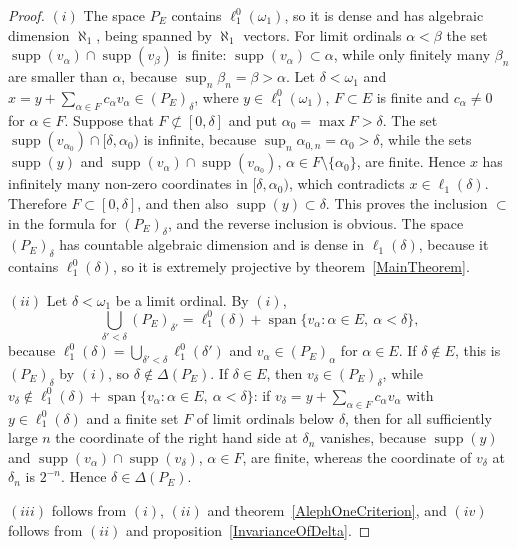 \documentclass[12pt]{article}
\newcommand{\lo}[1]{\ell_1^0(#1)}
\newcommand{\ellone}[1]{\ell_1(#1)}
\newcommand{\supp}{\operatorname{supp}}
\newcommand{\Lin}{\operatorname{span}}
\begin{document}
\begin{proof} $(i)$ The space $P_E$ contains $\lo{\omega_1}$, so it is dense
    and has algebraic dimension $\aleph_1$, being spanned by $\aleph_1$
    vectors. For limit ordinals $\alpha<\beta$
    the set $\supp(v_\alpha)\cap\supp(v_\beta)$ is finite:
    $\supp(v_\alpha)\subset\alpha$, while only finitely many $\beta_n$ are
    smaller than $\alpha$, because $\sup_n\beta_n=\beta>\alpha$. Let
    $\delta<\omega_1$ and $x=y+\sum_{\alpha\in F}c_\alpha v_\alpha\in(P_E)_\delta$,
    where $y\in\lo{\omega_1}$, $F\subset E$ is finite and $c_\alpha\neq 0$ for
    $\alpha\in F$. Suppose that $F\not\subset[0,\delta]$ and put
    $\alpha_0=\max F>\delta$. The set $\supp(v_{\alpha_0})\cap[\delta,\alpha_0)$
    is infinite, because $\sup_n\alpha_{0,n}=\alpha_0>\delta$, while the sets
    $\supp(y)$ and $\supp(v_\alpha)\cap\supp(v_{\alpha_0})$,
    $\alpha\in F\setminus\{\alpha_0\}$, are finite. Hence $x$ has infinitely
    many non-zero coordinates in $[\delta,\alpha_0)$, which contradicts
    $x\in\ellone{\delta}$. Therefore $F\subset[0,\delta]$, and then also
    $\supp(y)\subset\delta$. This proves the inclusion $\subset$ in the
    formula for $(P_E)_\delta$, and the reverse inclusion is obvious. The
    space $(P_E)_\delta$ has countable algebraic dimension and is dense in
    $\ellone{\delta}$, because it contains $\lo{\delta}$, so it is extremely
    projective by theorem~\ref{MainTheorem}.

    $(ii)$ Let $\delta<\omega_1$ be a limit ordinal. By $(i)$,
    \[
    \bigcup_{\delta'<\delta}(P_E)_{\delta'}=\lo{\delta}+\Lin\{v_\alpha:\alpha\in E,\ \alpha<\delta\},
    \]
    because $\lo{\delta}=\bigcup_{\delta'<\delta}\lo{\delta'}$ and
    $v_\alpha\in(P_E)_\alpha$ for $\alpha\in E$. If $\delta\notin E$, this is
    $(P_E)_\delta$ by $(i)$, so $\delta\notin\Delta(P_E)$. If $\delta\in E$,
    then $v_\delta\in(P_E)_\delta$, while
    $v_\delta\notin\lo{\delta}+\Lin\{v_\alpha:\alpha\in E,\ \alpha<\delta\}$:
    if $v_\delta=y+\sum_{\alpha\in F}c_\alpha v_\alpha$ with $y\in\lo{\delta}$
    and a finite set $F$ of limit ordinals below $\delta$, then for all
    sufficiently large $n$ the coordinate of the right hand side at
    $\delta_n$ vanishes, because $\supp(y)$ and $\supp(v_\alpha)\cap\supp(v_\delta)$,
    $\alpha\in F$, are finite, whereas the coordinate of $v_\delta$ at
    $\delta_n$ is $2^{-n}$. Hence $\delta\in\Delta(P_E)$.

    $(iii)$ follows from $(i)$, $(ii)$ and theorem~\ref{AlephOneCriterion}, and
    $(iv)$ follows from $(ii)$ and proposition~\ref{InvarianceOfDelta}.


\end{proof}
\end{document}
